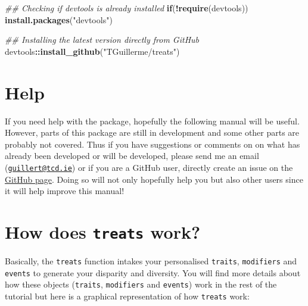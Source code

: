 \documentclass[
]{book}
\newenvironment{Shaded}{\begin{snugshade}}{\end{snugshade}}
\newcommand{\CommentTok}[1]{\textcolor[rgb]{0.56,0.35,0.01}{\textit{#1}}}
\newcommand{\ControlFlowTok}[1]{\textcolor[rgb]{0.13,0.29,0.53}{\textbf{#1}}}
\newcommand{\KeywordTok}[1]{\textcolor[rgb]{0.13,0.29,0.53}{\textbf{#1}}}
\newcommand{\NormalTok}[1]{#1}
\newcommand{\OperatorTok}[1]{\textcolor[rgb]{0.81,0.36,0.00}{\textbf{#1}}}
\newcommand{\StringTok}[1]{\textcolor[rgb]{0.31,0.60,0.02}{#1}}
\begin{document}
\begin{Shaded}
\begin{Highlighting}[]
\CommentTok{\#\# Checking if devtools is already installed}
\ControlFlowTok{if}\NormalTok{(}\OperatorTok{!}\KeywordTok{require}\NormalTok{(devtools)) }\KeywordTok{install.packages}\NormalTok{(}\StringTok{"devtools"}\NormalTok{)}

\CommentTok{\#\# Installing the latest version directly from GitHub}
\NormalTok{devtools}\OperatorTok{::}\KeywordTok{install\_github}\NormalTok{(}\StringTok{"TGuillerme/treats"}\NormalTok{)}
\end{Highlighting}
\end{Shaded}

\hypertarget{help}{%
\section{Help}\label{help}}

If you need help with the package, hopefully the following manual will be useful.
However, parts of this package are still in development and some other parts are probably not covered.
Thus if you have suggestions or comments on on what has already been developed or will be developed, please send me an email (\href{mailto:guillert@tcd.ie}{\nolinkurl{guillert@tcd.ie}}) or if you are a GitHub user, directly create an issue on the \href{https://github.com/TGuillerme/treats}{GitHub page}.
Doing so will not only hopefully help you but also other users since it will help improve this manual!

\hypertarget{how-does-treats-work}{%
\section{\texorpdfstring{How does \texttt{treats} work?}{How does treats work?}}\label{how-does-treats-work}}

Basically, the \texttt{treats} function intakes your personalised \texttt{traits}, \texttt{modifiers} and \texttt{events} to generate your disparity and diversity.
You will find more details about how these objects (\texttt{traits}, \texttt{modifiers} and \texttt{events}) work in the rest of the tutorial but here is a graphical representation of how \texttt{treats} work:
\end{document}
